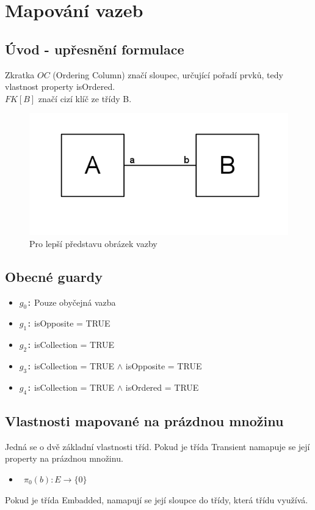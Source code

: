 \documentclass[11pt,a4paper]{article}
\begin{document}
\section{Mapování vazeb}
	\subsection{Úvod - upřesnění formulace}
	Zkratka $OC$ (Ordering Column) značí sloupec, určující pořadí prvků, tedy vlastnost property isOrdered. \\
	$FK[B]$ značí cizí klíč ze třídy B.
		\begin{figure}	             
    		\includegraphics[scale=0.9]{./AB.png}
    		\caption{Pro lepší představu obrázek vazby}			     
    		\label{pict:vazba}		             
   		\end{figure}
	\subsection{Obecné guardy}
	     \begin{itemize}
	     	\item $ g_0 $\texttt : {Pouze obyčejná vazba}				
         	\item $ g_1 $\texttt : {isOpposite = TRUE}
         	\item $ g_2 $\texttt : {isCollection = TRUE}
         	\item $ g_3 $\texttt : {isCollection = TRUE $\wedge$ isOpposite = TRUE}
         	\item $ g_4 $\texttt : {isCollection = TRUE $\wedge$ isOrdered = TRUE}    		  							
   		\end{itemize}						                                
	\subsection{Vlastnosti mapované na prázdnou množinu}
   		Jedná se o dvě základní vlastnosti tříd. Pokud je třída 
   		Transient namapuje se její property na prázdnou množinu. 
   		\begin{itemize}				    
         	\item \texttt	{
         					$\pi_0(b) : E \to \{ 0\}$  
         					}
   		\end{itemize}
   		Pokud je třída Embadded, namapují se její sloupce do třídy, která třídu využívá.
\end{document}
